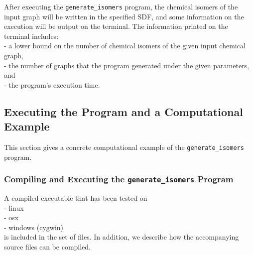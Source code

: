 \documentclass[11pt,titlepage,dvipdfmx,twoside]{article}
\begin{document}
After executing the {\tt generate\_isomers} program,
the chemical isomers of the input graph will be written
in the specified SDF, and some information on the execution will be output on 
the terminal.
The information printed on the terminal includes:\\
 - a lower bound on the number of chemical isomers of the given input chemical graph, \\
 - the number of graphs that the program generated under the given parameters, and \\
 - the program's execution time.
 


\subsection{Executing the Program and a Computational Example}
\label{sec:Example_m}

This section gives a concrete computational example of the {\tt generate\_isomers} program.


\subsubsection{Compiling and Executing the {\tt generate\_isomers} Program}
\label{sec:compile_m}

A compiled executable that has been tested on \\
- linux \\
- osx \\
- windows (cygwin) \\
is included in the set of files.
In addition, we describe how the accompanying source files can be compiled.
\end{document}
